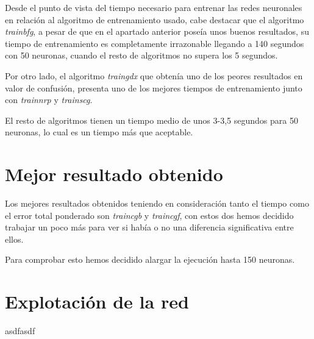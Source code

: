 \documentclass[a4paper,12pt,titlepage]{article}
\begin{document}
Desde el punto de vista del tiempo necesario para entrenar las redes neuronales en relación al algoritmo de entrenamiento usado, cabe destacar que el algoritmo \textit{trainbfg}, a pesar de que en el apartado anterior poseía unos buenos resultados, su tiempo de entrenamiento es completamente irrazonable llegando a 140 segundos con 50 neuronas, cuando el resto de algoritmos no supera los 5 segundos. 

Por otro lado, el algoritmo \textit{traingdx} que obtenía uno de los peores resultados en valor de confusión, presenta uno de los mejores tiempos de entrenamiento junto con \textit{trainnrp} y \textit{trainscg}.

El resto de algoritmos tienen un tiempo medio de unos 3-3,5 segundos para 50 neuronas, lo cual es un tiempo más que aceptable.

\section{Mejor resultado obtenido}

Los mejores resultados obtenidos teniendo en consideración tanto el tiempo como el error total ponderado son \textit{traincgb} y \textit{traincgf}, con estos dos hemos decidido trabajar un poco más para ver si había o no una diferencia significativa entre ellos. 

Para comprobar esto hemos decidido alargar la ejecución hasta 150 neuronas.

\section{Explotación de la red}

asdfasdf

\newpage


\end{document}
